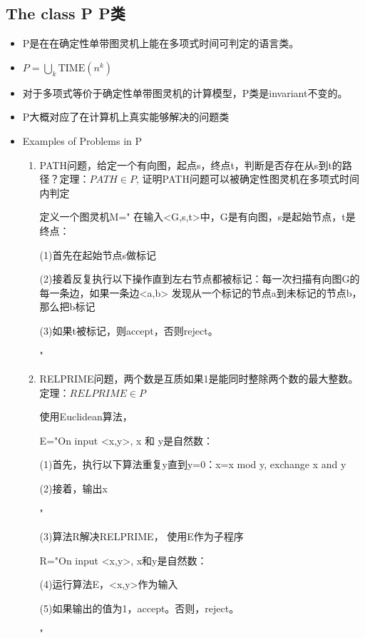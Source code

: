 \documentclass[UTF8]{ctexart}
\begin{document}
\subsection{The class P P类}
\begin{itemize}
    \item P是在在确定性单带图灵机上能在多项式时间可判定的语言类。
    \item $P=\bigcup\limits_{k} \mathrm{TIME}(n^k)$
    \item 对于多项式等价于确定性单带图灵机的计算模型，P类是invariant不变的。
    \item P大概对应了在计算机上真实能够解决的问题类
    \item Examples of Problems in P
    \begin{enumerate}
        \item PATH问题，给定一个有向图，起点s，终点t，判断是否存在从s到t的路径？定理：$PATH \in P$, 证明PATH问题可以被确定性图灵机在多项式时间内判定
        
        定义一个图灵机M="
        在输入<G,s,t>中，G是有向图，s是起始节点，t是终点：

        (1)首先在起始节点s做标记

        (2)接着反复执行以下操作直到左右节点都被标记：每一次扫描有向图G的每一条边，如果一条边<a,b> 发现从一个标记的节点a到未标记的节点b，那么把b标记

        (3)如果t被标记，则accept，否则reject。

        "

        \item RELPRIME问题，两个数是互质如果1是能同时整除两个数的最大整数。定理：$RELPRIME \in P$
        
        使用Euclidean算法，

        E="On input <x,y>, x 和 y是自然数：

        (1)首先，执行以下算法重复y直到y=0：x=x mod y, exchange x and y

        (2)接着，输出x
        
        "

        (3)算法R解决RELPRIME， 使用E作为子程序

        R="On input <x,y>, x和y是自然数：

        (4)运行算法E，<x,y>作为输入

        (5)如果输出的值为1，accept。否则，reject。

        "


    \end{enumerate}
\end{itemize}
\end{document}
